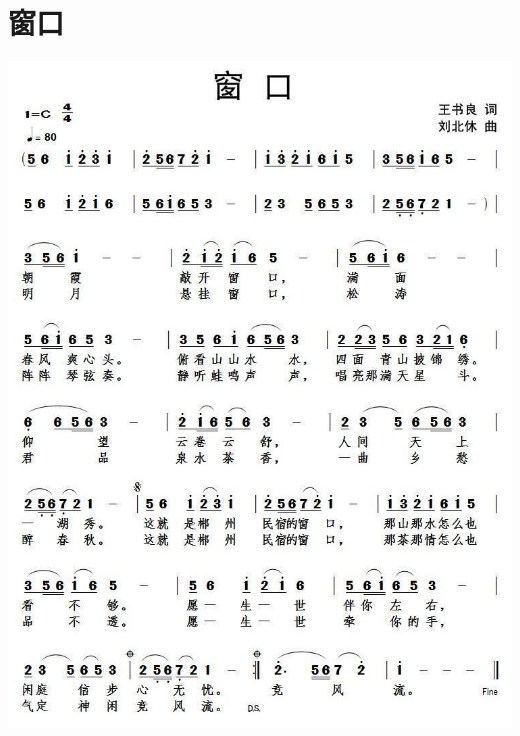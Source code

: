 \documentclass[cn,pad,twocol]{elegantbook}
\begin{document}
\section{窗口} \includegraphics[width=\textwidth]{macos/20210208窗口.jpg}
\end{document}
